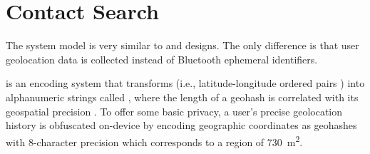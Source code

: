 \section{Contact Search}\label{sec:contact-search}

\newcommand{\histories}{\vSet{H}}
\newcommand{\locations}{\mathbb{L}}
\newcommand{\locset}{\vSet{L}}
\newcommand{\latitude}{\phi}
\newcommand{\longitude}{\lambda}
\newcommand{\users}{\vSet{U}}
\newcommand{\sindex}{\vSet{I}}
\newcommand{\query}{\vSet{N}}
\newcommand{\qelement}{q}
\newcommand{\hone}{G}
\newcommand{\htwo}{H}
\newcommand{\neighbors}{\vSet{N}}


The system model is very similar to \citet{Ayday2020, Ayday2021} and designs. The only difference is that user geolocation data is collected instead of Bluetooth ephemeral identifiers.

 is an encoding system that transforms  (i.e., latitude-longitude ordered pairs \cite[p. 5]{Sickle2004}) into alphanumeric strings called , where the length of a geohash is correlated with its geospatial precision \citep{Morton1966}. To offer some basic privacy, a user's precise geolocation history is obfuscated on-device by encoding geographic coordinates as geohashes with 8-character precision which corresponds to a region of \qty{730}{\meter^2}.


